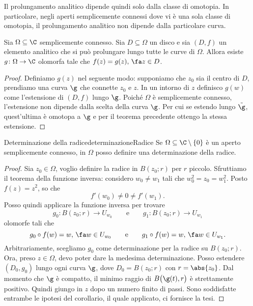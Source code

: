 \begin{oss}
	Il prolungamento analitico dipende quindi solo dalla classe di omotopia.
	In particolare, negli aperti semplicemente connessi dove vi è una sola classe di omotopia, il prolungamento analitico non dipende dalla particolare curva.
\end{oss}

\begin{cor}
	Sia \(\Omega\subseteq\C\) semplicemente connesso. Sia \(D\subseteq\Omega\) un disco e sia \((D,f)\) un elemento analitico che si può prolungare lungo tutte le curve di \(\Omega\).
	Allora esiste \(g\colon \Omega \to \C\) olomorfa tale che \(f(z)=g(z),\,\fa z \in D\).
\end{cor}

\begin{proof}
	Definiamo \(g(z)\) nel seguente modo:
	supponiamo che \(z_0\) sia il centro di \(D\), prendiamo una curva \(\g\) che connette \(z_0\) e \(z\).
	In un intorno di \(z\) definisco \(g(w)\) come l'estensione di \((D,f)\) lungo \(\g\).
	Poiché \(\Omega\) è semplicemente connesso, l'estensione non dipende dalla scelta della curva \(\g\).
	Per cui se estendo lungo \(\tilde{\g}\), quest'ultima è omotopa a \(\g\) e per il teorema precedente ottengo la stessa estensione.
\end{proof}

\begin{prop}{Determinazione della radice}{determinazioneRadice}
	Se \(\Omega\subseteq\C\setminus\{0\}\) è un aperto semplicemente connesso, in \(\Omega\) posso definire una determinazione della radice.
\end{prop}

\begin{proof}
	Sia \(z_0\in\Omega\), voglio definire la radice in \(B(z_0;r)\) per \(r\) piccolo.
	Sfruttiamo il teorema della funzione inversa: considero \(w_0\neq w_1\) tali che \(w_0^2=z_0=w_1^2\).
	Posto \(f(z)=z^2\), so che
	\[
		f'(w_0) \neq 0 \neq f'(w_1).
	\]
	Posso quindi applicare la funzione inversa per trovare
	\[
		g_0\colon B(z_0;r) \to U_{w_0} \qquad\text{e}\qquad g_1\colon B(z_0;r) \to U_{w_1}
	\]
	olomorfe tali che
	\[
		g_0\circ f(w) = w,\,\fa w\in U_{w_0} \qquad\text{e}\qquad g_1\circ f(w) = w,\,\fa w\in U_{w_1}.
	\]
	Arbitrariamente, scegliamo \(g_0\) come determinazione per la radice su \(B(z_0;r)\). Ora, preso \(z\in \Omega\), devo poter dare la medesima determinazione.
	Posso estendere \((D_0,g_0)\) lungo ogni curva \(\g\), dove \(D_0=B(z_0;r)\) con \(r=\abs{z_0}\).
	Dal momento che \(\g\) è compatto, il minimo raggio di \(B\big(\g(t),r\big)\) è strettamente positivo. Quindi giungo in \(z\) dopo un numero finito di passi.
	Sono soddisfatte entrambe le ipotesi del corollario, il quale applicato, ci fornisce la tesi.
\end{proof}

